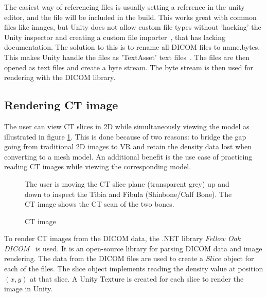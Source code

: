 \documentclass[a4paper]{report}
\begin{document}
The easiest way of referencing files is usually setting a reference in the unity editor, and the file will be included in the build. This works great with common files like images, but Unity does not allow custom file types without 'hacking' the Unity inspector and creating a custom file importer~\cite{scriptedimporters_unity_nodate}, that has lacking documentation. The solution to this is to rename all DICOM files to {name}.bytes. This makes Unity handle the files as 'TextAsset' text files~\cite{textassets_unity_nodate}. The files are then opened as text files and create a byte stream. The byte stream is then used for rendering with the DICOM library.

\subsection{Rendering CT image}

The user can view CT slices in 2D while simultaneously viewing the model as illustrated in figure \ref{ctscan}. This is done because of two reasons: to bridge the gap going from traditional 2D images to VR and retain the density data lost when converting to a mesh model. An additional benefit is the use case of practicing reading CT images while viewing the corresponding model.

\begin{figure}[h!]
    \centering
	\hfill
	\caption{CT image}\label{ctscan}
  \small
 The user is moving the CT slice plane (transparent grey) up and down to inspect the Tibia and Fibula (Shinbone/Calf Bone). The CT image shows the CT scan of the two bones.
~~\cite{mishra_virtual_2019}
\end{figure}

To render CT images from the DICOM data, the .NET library \emph{Fellow Oak DICOM}~\cite{noauthor_fellow_2022} is used. It is an open-source library for parsing DICOM data and image rendering.
The data from the DICOM files are used to create a $Slice$ object for each of the files. The slice object implements reading the density value at position $(x, y)$ at that slice. A Unity Texture is created for each slice to render the image in Unity.
\end{document}
